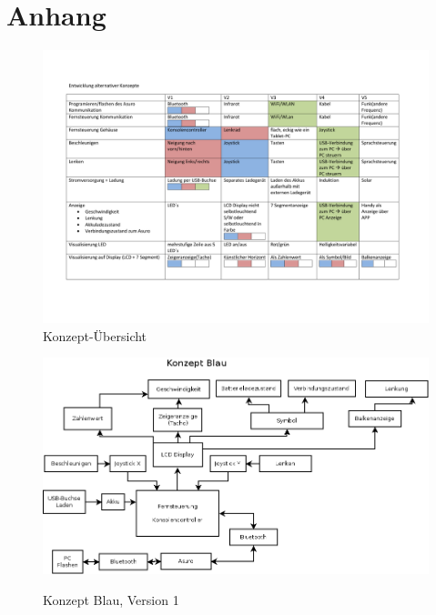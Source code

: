 \chapter{Anhang}

\begin{figure}
	\centering
	\includegraphics[angle=90, width=\textwidth]{konzepte_v1/Konzepte.pdf}
	\caption{Konzept-Übersicht}
	\label{fig:konzepte1}
\end{figure}

\begin{figure}
	\centering
	\includegraphics[width=\textwidth]{konzepte_v1/Konzept_Blau.png}
	\label{fig:blau_v1}
	\caption{Konzept Blau, Version 1}
\end{figure}

